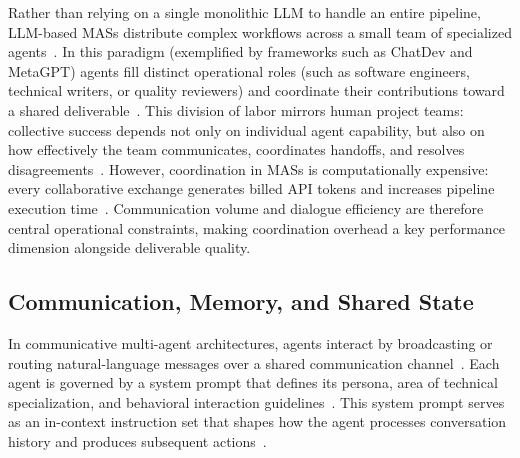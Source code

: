 Rather than relying on a single monolithic \ac{LLM} to handle an entire pipeline, \ac{LLM}-based \acp{MAS} distribute complex workflows across a small team of specialized agents~\cite{guo2024largelanguagemodelbased, dang2025multiagentcollaborationevolvingorchestration, chen2023agentversefacilitatingmultiagentcollaboration}.
In this paradigm (exemplified by frameworks such as ChatDev and MetaGPT) agents fill distinct operational roles (such as software engineers, technical writers, or quality reviewers) and coordinate their contributions toward a shared deliverable~\cite{hong2024metagptmetaprogrammingmultiagent, qian2024chatdevcommunicativeagentssoftware}.
This division of labor mirrors human project teams: collective success depends not only on individual agent capability, but also on how effectively the team communicates, coordinates handoffs, and resolves disagreements~\cite{muralidharan2025lessonshumanteamsapplied, mathieu2017teamwork, wageman2005teamdiagnosticsurvey}.
However, coordination in \acp{MAS} is computationally expensive: every collaborative exchange generates billed \ac{API} tokens and increases pipeline execution time~\cite{zhang2024cutcrapeconomicalcommunication, wang2025agentdropoutdynamicagentelimination}.
Communication volume and dialogue efficiency are therefore central operational constraints, making coordination overhead a key performance dimension alongside deliverable quality.

\subsection{Communication, Memory, and Shared State}
\label{subsec:communication-memory-shared-state}

In communicative multi-agent architectures, agents interact by broadcasting or routing natural-language messages over a shared communication channel~\cite{wu2023autogenenablingnextgenllm, hong2024metagptmetaprogrammingmultiagent, guo2024largelanguagemodelbased}.
Each agent is governed by a system prompt that defines its persona, area of technical specialization, and behavioral interaction guidelines~\cite{dang2025multiagentcollaborationevolvingorchestration, li2023camelcommunicativeagentsmind, qian2024chatdevcommunicativeagentssoftware}.
This system prompt serves as an in-context instruction set that shapes how the agent processes conversation history and produces subsequent actions~\cite{white2023promptpatterncatalogenhance, shanahan2023roleplaylargelanguagemodels}.

